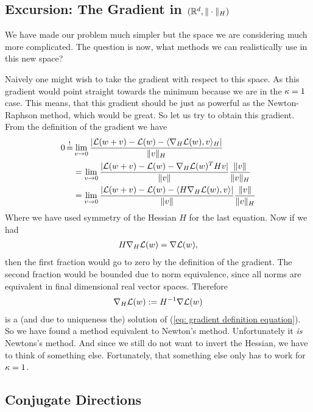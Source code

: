 \subsection{Excursion: The Gradient in \((\mathbb{R}^d, \|\cdot\|_H)\)}

We have made our problem much simpler but the space we are considering much
more complicated. The question is now, what methods we can realistically use
in this new space?

Naively one might wish to take the gradient with respect to this space. As this
gradient would point straight towards the minimum because we are in the
\(\kappa=1\) case. This means, that this gradient should be just as
powerful as the Newton-Raphson method, which would be great. So let us try to
obtain this gradient. From the definition of the gradient we have
\begin{align}
	\label{eq: gradient definition equation}
	0\xeq{!}&\lim_{v\to 0}\frac{
		|\Loss(\weights + v) - \Loss(\weights) - \langle \nabla_H\Loss(\weights), v\rangle_H |
	}{\|v\|_H}\\
	\nonumber
	&=\lim_{v\to 0}\frac{
		|\Loss(\weights + v) - \Loss(\weights) -  \nabla_H\Loss(\weights)^T H v |
	}{\|v\|}
	\frac{\|v\|}{\|v\|_H}\\
	\nonumber
	&=\lim_{v\to 0}\frac{
		|\Loss(\weights + v) - \Loss(\weights) -  \langle H\nabla_H\Loss(\weights), v\rangle |
	}{\|v\|}
	\frac{\|v\|}{\|v\|_H}
\end{align}
Where we have used symmetry of the Hessian \(H\) for the last equation. Now if
we had
\begin{align*}
	H \nabla_H \mathcal{L}(w) = \nabla\mathcal{L}(w),
\end{align*}
then the first fraction would go to zero by the definition of the gradient.
The second fraction would be bounded due to norm equivalence, since all norms
are equivalent in final dimensional real vector spaces. Therefore
\begin{align*}
	\nabla_H \mathcal{L}(w) := H^{-1}\nabla\mathcal{L}(w)
\end{align*}
is a (and due to uniqueness the) solution of (\ref{eq: gradient definition
equation}). So we have found a method equivalent to Newton's method.
Unfortunately it \emph{is} Newtons's method. And since we still do not want
to invert the Hessian, we have to think of something else. Fortunately, that
something else only has to work for \(\kappa=1\).

\subsection{Conjugate Directions}

